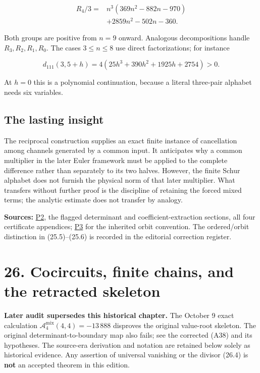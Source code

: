 \documentclass[
  10pt,
  a4paper,
  10pt,
  oneside,
  openany]{book}
\begin{document}
\[
\begin{aligned}
R_4/3={}&n^3(369n^2-882n-970)\\
&+2859n^2-502n-360.
\end{aligned}
\]

Both groups are positive from \(n=9\) onward. Analogous decompositions
handle \(R_3,R_2,R_1,R_0\). The cases \(3\le n\le8\) use direct
factorizations; for instance

\[
 d_{111}(3,5+h)=4(25h^3+390h^2+1925h+2754)>0.
\]

At \(h=0\) this is a polynomial continuation, because a literal
three-pair alphabet needs six variables.

\subsection{The lasting insight}\label{the-lasting-insight}

The reciprocal construction supplies an exact finite instance of
cancellation among channels generated by a common input. It anticipates
why a common multiplier in the later Euler framework must be applied to
the complete difference rather than separately to its two halves.
However, the finite Schur alphabet does not furnish the physical norm of
that later multiplier. What transfers without further proof is the
discipline of retaining the forced mixed terms; the analytic estimate
does not transfer by analogy.

\textbf{Sources:} \hyperref[source-p2]{P2}, the flagged determinant and
coefficient-extraction sections, all four certificate appendices;
\hyperref[source-p3]{P3} for the inherited orbit convention. The
ordered/orbit distinction in (25.5)--(25.6) is recorded in the editorial
correction register.

\section{26. Cocircuits, finite chains, and the retracted
skeleton}\label{ch-cocircuit}

\textbf{Later audit supersedes this historical chapter.} The October 9
exact calculation \(\mathcal A_4^{\mathrm{mix}}(4,4)=-13\,888\)
disproves the original value-root skeleton. The original
determinant-to-boundary map also fails; see the corrected (A38) and its
hypotheses. The source-era derivation and notation are retained below
solely as historical evidence. Any assertion of universal vanishing or
the divisor (26.4) is \textbf{not} an accepted theorem in this edition.
\end{document}

